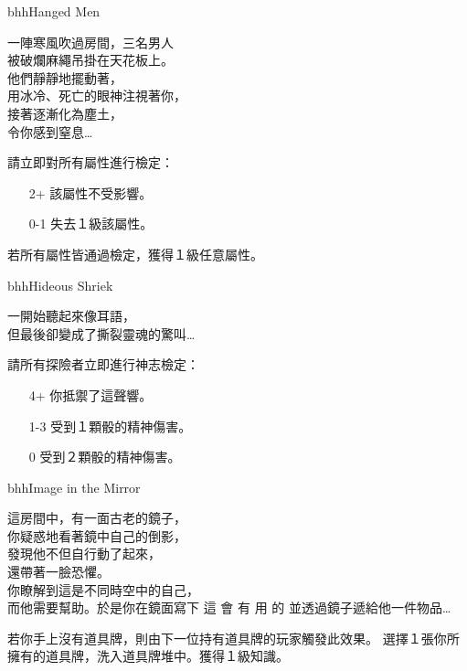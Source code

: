 \linebreak[0]%
\begin{EventCard}{bhh}{Hanged Men}
  \begin{CardStory}
    一陣寒風吹過房間，三名男人\\
    被破爛麻繩吊掛在天花板上。\\
    他們靜靜地擺動著，\\
    用冰冷、死亡的眼神注視著你，\\
    接著逐漸化為塵土，\\
    令你感到窒息…
  \end{CardStory}
  請立即對所有屬性進行檢定：
  \begin{itemize}
    \item[2+] 該屬性不受影響。
    \item[0-1] 失去１級該屬性。
  \end{itemize}
  若所有屬性皆通過檢定，獲得１級任意屬性。\smallbreak
\end{EventCard}%
\linebreak[0]%
\begin{EventCard}{bhh}{Hideous Shriek}
  \begin{CardStory}
    一開始聽起來像耳語，\\
    但最後卻變成了撕裂靈魂的驚叫…
  \end{CardStory}
  請所有探險者立即進行神志檢定：
  \begin{itemize}
    \item[4+] 你抵禦了這聲響。
    \item[1-3] 受到１顆骰的精神傷害。
    \item[0] 受到２顆骰的精神傷害。
  \end{itemize}
\end{EventCard}%
\linebreak[0]%
\begin{EventCard}{bhh}{Image in the Mirror}
  \begin{CardStory}
    這房間中，有一面古老的鏡子，\\
    你疑惑地看著鏡中自己的倒影，\\
    發現他不但自行動了起來，\\
    還帶著一臉恐懼。\\
    你瞭解到這是不同時空中的自己，\\
    而他需要幫助。於是你在鏡面寫下\smallbreak
    { \FontScript 這 \enskip 會 \enskip 有 \enskip 用 \enskip 的 }\smallbreak
    並透過鏡子遞給他一件物品…
\end{CardStory}
  若你手上沒有道具牌，則由下一位持有道具牌的玩家觸發此效果。\smallbreak
  選擇１張你所擁有的道具牌，洗入道具牌堆中。獲得１級知識。\smallbreak
\end{EventCard}%
